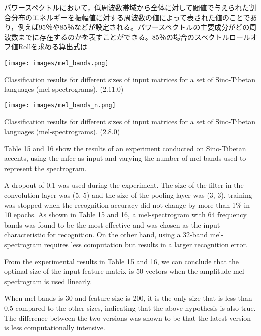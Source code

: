 パワースペクトルにおいて，低周波数帯域から全体に対して閾値で与えられた割合分布のエネルギーを振幅値に対する周波数の値によって表された値のことであり，例えば95％や85％などが設定される。パワースペクトルの主要成分がどの周波数までに存在するのかを表すことができる。85％の場合のスペクトルロールオフ値Rollを求める算出式は\documentclass[ams]{U-AizuGT}
\begin{document}
\begin{table}[h]
    \centering
    \texttt{[image: images/mel\_bands.png]}
    \caption{Classification results for different sizes of input matrices for a set of Sino-Tibetan languages (mel-spectrograms). (2.11.0)}
\end{table}
\begin{table}[h]
    \centering
    \texttt{[image: images/mel\_bands\_n.png]}
    \caption{Classification results for different sizes of input matrices for a set of Sino-Tibetan languages (mel-spectrograms). (2.8.0)}
\end{table}
Table 15 and 16 show the results of an experiment conducted on Sino-Tibetan accents, using the mfcc as input and varying the number of mel-bands used to represent the spectrogram.\par
A dropout of 0.1 was used during the experiment. The size of the filter in the convolution layer was (5, 5) and the size of the pooling layer was (3, 3). training was stopped when the recognition accuracy did not change by more than 1\% in 10 epochs.
As shown in Table 15 and 16, a mel-spectrogram with 64 frequency bands was found to be the most effective and was chosen as the input characteristic for recognition. On the other hand, using a 32-band mel-spectrogram requires less computation but results in a larger recognition error.\par
From the experimental results in Table 15 and 16, we can conclude that the optimal size of the input feature matrix is 50 vectors when the amplitude mel-spectrogram is used linearly.\par
When mel-bands is 30 and feature size is 200, it is the only size that is less than 0.5 compared to the other sizes, indicating that the above hypothesis is also true.
The difference between the two versions was shown to be that the latest version is less computationally intensive.
\end{document}
